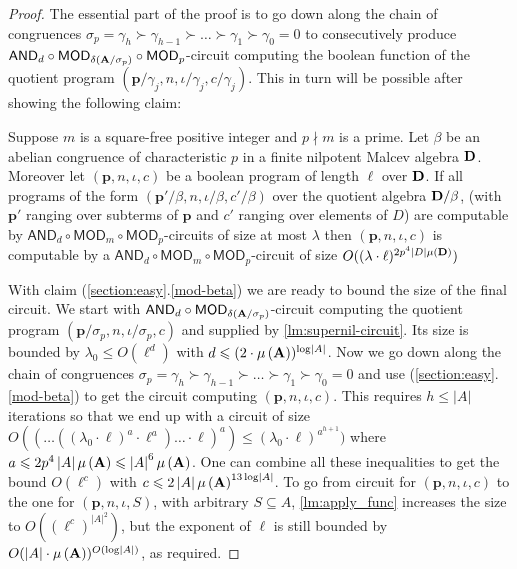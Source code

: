 \documentclass[11pt,a4paper]{amsart}
\newcounter{senumi}[section]
\newcounter{senumip}[section]
\newcounter{temp}[section]
\def\thesenumi{\thesection.\arabic{senumip}}
\newenvironment{senumerate}{\begin{list}{\hspace{-2em}(\thesenumi)}{\usecounter{senumip}}
\setcounter{senumip}{\value{temp}}
    }{\setcounter{temp}{\value{senumip}}
     \end{list}}
\newcommand{\m}[1]{{\uppercase {\bf{#1}}}}
\newcommand{\ci}{\subseteq}
\newcommand{\card}[1]{\left| #1 \right|}
\renewcommand{\leq}{\leqslant}
\newcommand{\po}[1]{{\mathbf {#1}}}
\newcounter{claim}
\newcommand{\cc}{c}
\newcommand{\progg}[4]{\left(#1,#2,#3,#4\right)}
\newcommand{\aexp}{a}
\newcommand{\ccc}{c}    \newcommand{\s}{s}
\newcommand{\csize}{\lambda}
\newcommand{\ccand}{\mathsf{AND}}
\newcommand{\ccmod}{\mathsf{MOD}}
\newcommand{\pdiv}[1]{\ppdiv\left(#1\right)}    \newcommand{\ar}[1]{\mu\left({#1}\right)}       \newcommand{\maxar}[1]{\mu\left({\m #1}\right)}
\begin{document}
\begin{proof}
The essential part of the proof is to go down along the chain of congruences
$\sigma_p=\gamma_h\succ\gamma_{h-1}\succ\ldots\succ\gamma_1\succ\gamma_0=0$
to consecutively produce $\ccand_d\circ\ccmod_{\pdiv{\m A/\sigma_p}}\circ\ccmod_p$-circuit
computing the boolean function
of the quotient program $\progg{\po p/\gamma_j}{n}{\iota/\gamma_j}{\ccc/\gamma_j}$.
This in turn will be possible after showing the following claim:
\begin{senumerate}
\item
\label{mod-beta}
Suppose $m$ is a square-free positive integer and $p\nmid m$ is a prime.
Let $\beta$ be an abelian congruence of characteristic $p$
in a finite nilpotent Malcev algebra $\m D$.
Moreover let $\progg{\po p}{n}{\iota}{\cc}$ be a boolean program of length $\ell$ over $\m D$.
If all programs of the form $\progg{\po p'/\beta}{n}{\iota/\beta}{\cc'/\beta}$
over the quotient algebra $\m D/\beta$,
(with $\po p'$ ranging over subterms of $\po p$ and $\cc'$ ranging over elements of $D$)
are computable by $\ccand_d\circ\ccmod_m\circ\ccmod_p$-circuits of size at most $\csize$
then $\progg{\po p}{n}{\iota}{\cc}$ is computable by a $\ccand_d\circ\ccmod_m\circ\ccmod_p$-circuit
of size $O((\csize\cdot\ell)^{2p^4\card{D}\maxar{D}})$
\end{senumerate}

With claim (\ref{section:easy}.\ref{mod-beta}) we are ready to bound the size of the final circuit.
We start with $\ccand_d\circ\ccmod_{\pdiv{\m A/\sigma_p}}$-circuit
computing the quotient program $\progg{\po p/\sigma_p}{n}{\iota/\sigma_p}{\cc}$ and
supplied by \cref{lm:supernil-circuit}.
Its size is bounded by $\csize_0\leq O(\ell^d)$ with $d\leq(2 \cdot \maxar A)^{\log\card{A}}$.
Now we go down along the chain of congruences
$\sigma_p=\gamma_h\succ\gamma_{h-1}\succ\ldots\succ\gamma_1\succ\gamma_0=0$
and use (\ref{section:easy}.\ref{mod-beta}) to get the circuit computing
$\progg{\po p}{n}{\iota}{\cc}$.
This requires $h\leq\card{A}$ iterations so that we end up with a circuit of size
$O((\ldots((\csize_0\cdot\ell)^\aexp\cdot\ell^\aexp)\ldots\cdot\ell)^\aexp)
\leq(\csize_0\cdot\ell)^{\aexp^{h+1}})$
where $\aexp\leq 2p^4\card{A}\maxar{A}\leq\card{A}^6\maxar{A}$.
One can combine all these inequalities to get the bound  $O(\ell^c)$
with $c\leq 2\card{A}\maxar{A}^{13\log\card{A}}$.
To go from circuit for $\progg{\po p}{n}{\iota}{\cc}$
to the one for $\progg{\po p}{n}{\iota}{S}$, with arbitrary $S\ci A$,
\cref{lm:apply_func} increases the size to $O((\ell^c)^{\card{A}^2})$,
but the exponent of $\ell$ is still bounded by
$O(\card{A}\cdot\maxar{A})^{O(\log\card{A})}$, as required.


\end{proof}
\end{document}
